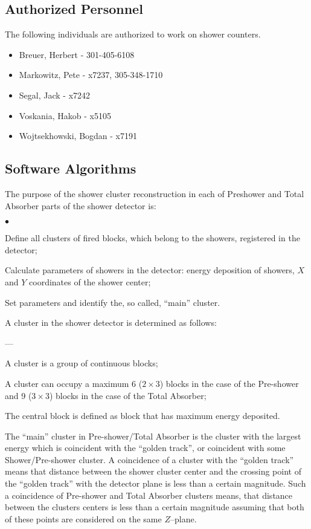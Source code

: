 \documentclass[12pt]{article}
\begin{document}
\subsection{Authorized Personnel} 
The following individuals are authorized to work on shower counters. 
\begin{itemize} 
\item[~]Breuer, Herbert - 301-405-6108 
\item[~]Markowitz, Pete - x7237, 305-348-1710
\item[~]Segal, Jack - x7242 
\item[~]Voskania, Hakob - x5105
\item[~]Wojtsekhowski, Bogdan - x7191 
\end{itemize} 

\subsection{Software Algorithms}
The purpose of the shower cluster reconstruction in each of Preshower and 
Total Absorber parts of the shower detector is:
\begin{list}{$\bullet$}{}
\item Define all clusters of fired blocks, which belong to the showers, 
      registered in the detector;
\item Calculate parameters of showers in the detector: energy deposition of 
      showers, $X$ and $Y$ coordinates of the shower center;
\item Set parameters and identify the, so called, ``main'' cluster.
\end{list}

\noindent A cluster in the shower detector is determined as follows:
\begin{list}{---}{}
\item A cluster is a group of continuous blocks; 
\item A cluster can occupy a maximum 6 ($2 \times 3$) blocks in the case of the
      Pre-shower and 9 ($3 \times 3$) blocks in the case of the Total Absorber; 
\item The central block is defined as block that has maximum energy deposited.
\end{list}

The ``main'' cluster in Pre-shower/Total Absorber is the cluster with
the largest energy which is coincident with the ``golden track'', or
coincident with some Shower/Pre-shower cluster.  A coincidence of a
cluster with the ``golden track'' means that distance between the
shower cluster center and the crossing point of the ``golden track''
with the detector plane is less than a certain magnitude.  Such a
coincidence of Pre-shower and Total Absorber clusters means, that
distance between the clusters centers is less than a certain magnitude
assuming that both of these points are considered on the same
$Z$--plane.  
\end{document}
